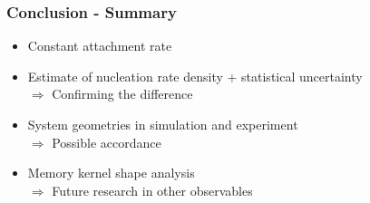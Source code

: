 \documentclass[smaller,notes=hide]{beamer}
\newlength{\wideitemsep}
\let\olditem\item
\renewcommand{\item}{\setlength{\itemsep}{\wideitemsep}\olditem}
\begin{document}
\begin{frame}
\frametitle{Conclusion - Summary}
\begin{itemize}
\item Constant attachment rate
\item Estimate of nucleation rate density + statistical uncertainty\\
$\Rightarrow$ Confirming the difference
\item System geometries in simulation and experiment\\
$\Rightarrow$ Possible accordance \vspace{0.25cm}
\item Memory kernel shape analysis\\
$\Rightarrow$ Future research in other observables
\end{itemize}
\end{frame}
\end{document}
